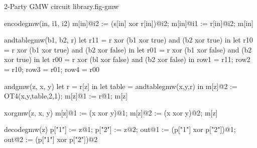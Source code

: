 \begin{fpfig}[t]{2-Party GMW circuit library.}{fig-gmw}
{\footnotesize
  \begin{verbatimtab}
    encodegmw(in, i1, i2) {
      m[in]@i2 := (s[in] xor r[in])@i2;
      m[in]@i1 := r[in]@i2;
      m[in]
    }
    
    andtablegmw(b1, b2, r) {
      let r11 = r xor (b1 xor true) and (b2 xor true) in
      let r10 = r xor (b1 xor true) and (b2 xor false) in
      let r01 = r xor (b1 xor false) and (b2 xor true) in
      let r00 = r xor (bl xor false) and (b2 xor false) in
      { row1 = r11; row2 = r10; row3 = r01; row4 = r00 }
    }
    
    andgmw(z, x, y) {
      let r = r[z] in
      let table = andtablegmw(x,y,r) in
      m[z]@2 := OT4(x,y,table,2,1);
      m[z]@1 := r@1;
      m[z]
    }
    
    xorgmw(z, x, y)
    { m[z]@1 := (x xor y)@1; m[z]@2 := (x xor y)@2; m[z] }
    
    decodegmw(z) {
      p["1"] := z@1; p["2"] := z@2;
      out@1 := (p["1"] xor p["2"])@1;
      out@2 := (p["1"] xor p["2"])@2
    }
  \end{verbatimtab}
}
\end{fpfig}
